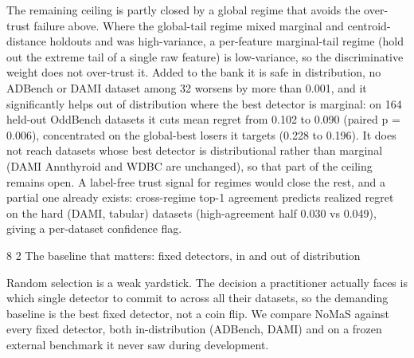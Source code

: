 \documentclass[3p,twocolumn]{elsarticle}
\makeatletter
\renewcommand\subsection{\@startsection{subsection}{2}{\z@}%
           {8\p@ \@plus 4\p@ \@minus 4\p@}%
           {2\p@ \@plus 4\p@ \@minus 3\p@}%
           {\normalfont\normalsize\itshape}}
\makeatother
\begin{document}
The remaining ceiling is partly closed by a global regime that avoids the over-trust failure above. Where the global-tail regime mixed marginal and centroid-distance holdouts and was high-variance, a per-feature marginal-tail regime (hold out the extreme tail of a single raw feature) is low-variance, so the discriminative weight does not over-trust it. Added to the bank it is safe in distribution, no ADBench or DAMI dataset among 32 worsens by more than 0.001, and it significantly helps out of distribution where the best detector is marginal: on 164 held-out OddBench datasets it cuts mean regret from 0.102 to 0.090 (paired p = 0.006), concentrated on the global-best losers it targets (0.228 to 0.196). It does not reach datasets whose best detector is distributional rather than marginal (DAMI Annthyroid and WDBC are unchanged), so that part of the ceiling remains open. A label-free trust signal for regimes would close the rest, and a partial one already exists: cross-regime top-1 agreement predicts realized regret on the hard (DAMI, tabular) datasets (high-agreement half 0.030 vs 0.049), giving a per-dataset confidence flag.

\subsection{The baseline that matters: fixed detectors, in and out of distribution}\label{55-the-baseline-that-matters-fixed-detectors-in-and-out-of-distribution}

Random selection is a weak yardstick. The decision a practitioner actually faces is which single detector to commit to across all their datasets, so the demanding baseline is the best fixed detector, not a coin flip. We compare NoMaS against every fixed detector, both in-distribution (ADBench, DAMI) and on a frozen external benchmark it never saw during development.
\end{document}
